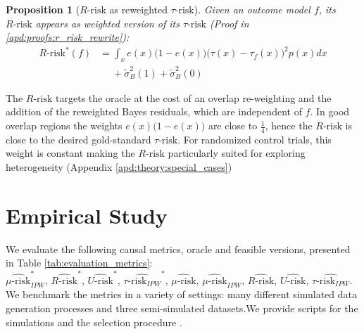 \documentclass[a4paper,num-refs]{oup-contemporary}%
\newtheorem{proposition}[theorem]{Proposition}%
\begin{document}
\begin{proposition}[$R \text{-risk}$ as reweighted
        $\tau\text{-risk}$]\label{theory:prop:r_risk_rewrite} Given an outcome model
    $f$, its $R\text{-risk}$ appears as weighted version of its $\tau\text{-risk}$
    (Proof in \ref{apd:proofs:r_risk_rewrite}):
    \begin{align}
        R\text{-risk}^*(f) & = \int_{x} e(x)\big(1-e(x)\big)\big(\tau(x)-\tau_ {f}(x)\big)^{2} p(x) d x \nonumber \\
                           & \quad\; + \tilde{\sigma}_B^2(1) + \tilde{\sigma}_B^{2}(0)
    \end{align}
\end{proposition}

The $R \text{-risk}$ targets the oracle at the cost of an overlap re-weighting
and the addition of the reweighted Bayes residuals, which are independent of
$f$. In good overlap regions the weights $e(x) \big(1-e(x) \big)$ are close to
$\frac{1}{4}$, hence the $R \text{-risk}$ is close to the desired gold-standard
$\tau \text{-risk}$. For randomized control trials, this weight is constant
making the $R\text{-risk}$ particularly suited for exploring
heterogeneity (Appendix \ref{apd:theory:special_cases})



\section{Empirical Study}\label{sec:empirical_study}


We evaluate the following causal metrics, oracle and feasible
versions, presented in Table
\ref{tab:evaluation_metrics}:\\
$\widehat{\mu\text{-risk}}_{IPW}^*$,
$\widehat{R\text{-risk}}^*$,
$\widehat{U\text{-risk}}^*$,
$\widehat{\tau\text{-risk}_{IPW}}^*$,
$\widehat{\mu\text{-risk}}$,
$\widehat{\mu\text{-risk}}_{IPW}$,
$\widehat{R\text{-risk}}$,
$\widehat{U\text{-risk}}$,
$\widehat{\tau\text{-risk}_{IPW}}$.
We benchmark the metrics in a variety of settings:
many different simulated data generation
processes and three semi-simulated datasets.We provide scripts for the simulations \cite{doutreligne2025caussim} and the selection procedure \cite{doutreligne2025causal}.
\end{document}
